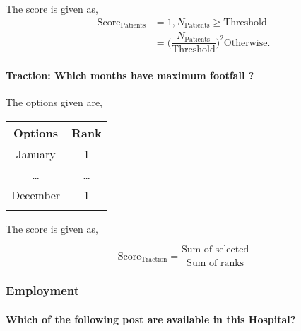 \documentclass[oneside]{article}
\newcommand{\tsub}[2]{\text{#1}_{\text{#2}}}
\newcommand{\tsubb}[2]{#1_{\text{#2}}}
\newcommand{\dsub}[2]{\dfrac{\text{#1}}{\text{#2}}}
\newcommand{\multsel}[1]
{
	\[
		\tsub{Score}{#1} = \dsub{Sum of selected}{Sum of ranks}
	\]
}
\newenvironment{ttable}
{
\begin{center}
\begin{tabular}{c|c}
\hline
}
{
\\ \hline
\end{tabular}
\end{center}
}
\begin{document}
The score is given as,
\begin{align*}
\tsub{Score}{Patients} &= 1, \tsubb{N}{Patients} \ge \text{Threshold} \\
        &=
\Big(\dfrac{\tsubb{N}{Patients}}{\text{Threshold}}\Big)^{2}
\text{Otherwise}.
\end{align*}
\paragraph{Traction: Which months have maximum footfall ?}

The options given are,
\begin{ttable}
Options & Rank \\ \hline
January & 1 \\
 \dots  & \dots \\
December & 1 \\
\hline
\end{ttable}
The score is given as,
\multsel{Traction}
\subsubsection{Employment}

\paragraph{ Which of the following post are available in this Hospital?}
\end{document}
